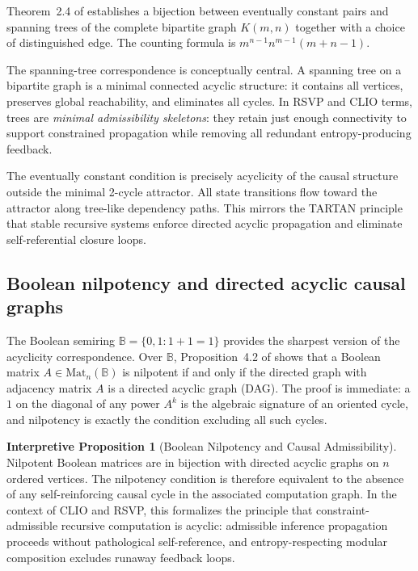 \documentclass[12pt, a4paper]{article}
\theoremstyle{plain}
\theoremstyle{definition}
\theoremstyle{correspondence}
\newtheorem{interpprop}[theorem]{Interpretive Proposition}
\newcommand{\BB}{\mathbb{B}}
\begin{document}
Theorem~2.4 of \cite{CIKLR25} establishes a bijection between eventually constant
pairs and spanning trees of the complete bipartite graph $K(m,n)$ together with a
choice of distinguished edge. The counting formula is $m^{n-1} n^{m-1}(m+n-1)$.

The spanning-tree correspondence is conceptually central. A spanning tree on a
bipartite graph is a minimal connected acyclic structure: it contains all vertices,
preserves global reachability, and eliminates all cycles. In RSVP and CLIO terms,
trees are \emph{minimal admissibility skeletons}: they retain just enough connectivity
to support constrained propagation while removing all redundant entropy-producing
feedback.

The eventually constant condition is precisely acyclicity of the causal structure
outside the minimal 2-cycle attractor. All state transitions flow toward the attractor
along tree-like dependency paths. This mirrors the TARTAN principle that stable
recursive systems enforce directed acyclic propagation and eliminate self-referential
closure loops.

\subsection{Boolean nilpotency and directed acyclic causal graphs}

The Boolean semiring $\BB = \{0,1 : 1 + 1 = 1\}$ provides the sharpest version of the
acyclicity correspondence. Over $\BB$, Proposition~4.2 of \cite{CIKLR25} shows that a
Boolean matrix $A \in \mathrm{Mat}_n(\BB)$ is nilpotent if and only if the directed
graph with adjacency matrix $A$ is a directed acyclic graph (DAG). The proof is
immediate: a $1$ on the diagonal of any power $A^k$ is the algebraic signature of an
oriented cycle, and nilpotency is exactly the condition excluding all such cycles.

\begin{interpprop}[Boolean Nilpotency and Causal Admissibility]
\label{ip:boolean}
Nilpotent Boolean matrices are in bijection with directed acyclic graphs on $n$ ordered
vertices. The nilpotency condition is therefore equivalent to the absence of any
self-reinforcing causal cycle in the associated computation graph. In the context of
CLIO and RSVP, this formalizes the principle that constraint-admissible recursive
computation is acyclic: admissible inference propagation proceeds without
pathological self-reference, and entropy-respecting modular composition excludes
runaway feedback loops.
\end{interpprop}
\end{document}
